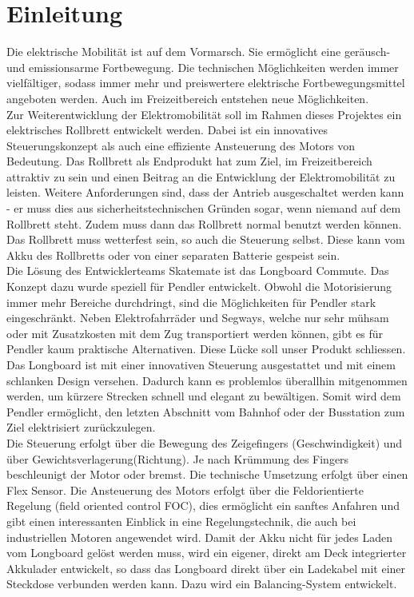\chapter{Einleitung}
Die elektrische Mobilität ist auf dem Vormarsch. Sie ermöglicht eine geräusch- und emissionsarme Fortbewegung. Die technischen Möglichkeiten werden immer vielfältiger, sodass immer mehr und preiswertere elektrische Fortbewegungsmittel angeboten werden. Auch im Freizeitbereich entstehen neue Möglichkeiten.\\
Zur Weiterentwicklung der Elektromobilität soll im Rahmen dieses Projektes ein elektrisches Rollbrett entwickelt werden. Dabei ist ein innovatives Steuerungskonzept als auch eine effiziente Ansteuerung des Motors von Bedeutung. Das Rollbrett als Endprodukt hat zum Ziel, im Freizeitbereich attraktiv zu sein und einen Beitrag an die Entwicklung der Elektromobilität zu leisten. Weitere Anforderungen sind, dass der Antrieb ausgeschaltet werden kann - er muss dies aus sicherheitstechnischen Gründen sogar, wenn niemand auf dem Rollbrett steht. Zudem muss dann das Rollbrett normal benutzt werden können. Das Rollbrett muss wetterfest sein, so auch die Steuerung selbst. Diese kann vom Akku des Rollbretts oder von einer separaten Batterie gespeist sein.  \\
Die Lösung des Entwicklerteams Skatemate ist das Longboard Commute. Das Konzept dazu wurde speziell für Pendler entwickelt. Obwohl die Motorisierung immer mehr Bereiche durchdringt, sind die Möglichkeiten für Pendler stark eingeschränkt. Neben Elektrofahrräder und Segways, welche nur sehr mühsam oder mit Zusatzkosten mit dem Zug transportiert werden können, gibt es für Pendler kaum praktische Alternativen. Diese Lücke soll unser Produkt schliessen. Das Longboard ist mit einer innovativen Steuerung ausgestattet und mit einem schlanken Design versehen. Dadurch kann es problemlos überallhin mitgenommen werden, um kürzere Strecken schnell und elegant zu bewältigen. Somit wird dem Pendler ermöglicht, den letzten Abschnitt vom Bahnhof oder der Busstation zum Ziel elektrisiert zurückzulegen. \\
Die Steuerung erfolgt über die Bewegung des Zeigefingers (Geschwindigkeit) und über Gewichtsverlagerung(Richtung). Je nach Krümmung des Fingers beschleunigt der Motor oder bremst. Die technische Umsetzung erfolgt über einen Flex Sensor. Die Ansteuerung des Motors erfolgt über die Feldorientierte Regelung (field oriented control FOC), dies ermöglicht ein sanftes Anfahren und gibt einen interessanten Einblick in eine Regelungstechnik, die auch bei industriellen Motoren angewendet wird. Damit der Akku nicht für jedes Laden vom Longboard gelöst werden muss, wird ein eigener, direkt am Deck integrierter Akkulader entwickelt, so dass das Longboard direkt über ein Ladekabel mit einer Steckdose verbunden werden kann. Dazu wird ein Balancing-System entwickelt.
